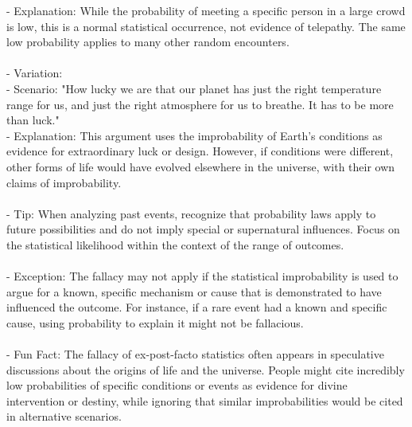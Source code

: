 \documentclass[a4paper,12pt,single,pdftex]{scrartcl}
\begin{document}
    
        - Explanation: While the probability of meeting a specific person in a large crowd is low, this is a normal statistical occurrence, not evidence of telepathy. The same low probability applies to many other random encounters.
    \\

    
      
    \\

    
      - Variation:
    \\

    
        - Scenario: "How lucky we are that our planet has just the right temperature range for us, and just the right atmosphere for us to breathe. It has to be more than luck."
    \\

    
        - Explanation: This argument uses the improbability of Earth’s conditions as evidence for extraordinary luck or design. However, if conditions were different, other forms of life would have evolved elsewhere in the universe, with their own claims of improbability.
    \\

    
      
    \\

    
      - Tip: When analyzing past events, recognize that probability laws apply to future possibilities and do not imply special or supernatural influences. Focus on the statistical likelihood within the context of the range of outcomes.
    \\

    
      
    \\

    
      - Exception: The fallacy may not apply if the statistical improbability is used to argue for a known, specific mechanism or cause that is demonstrated to have influenced the outcome. For instance, if a rare event had a known and specific cause, using probability to explain it might not be fallacious.
    \\

    
      
    \\

    
      - Fun Fact: The fallacy of ex-post-facto statistics often appears in speculative discussions about the origins of life and the universe. People might cite incredibly low probabilities of specific conditions or events as evidence for divine intervention or destiny, while ignoring that similar improbabilities would be cited in alternative scenarios.
    \\
\end{document}
